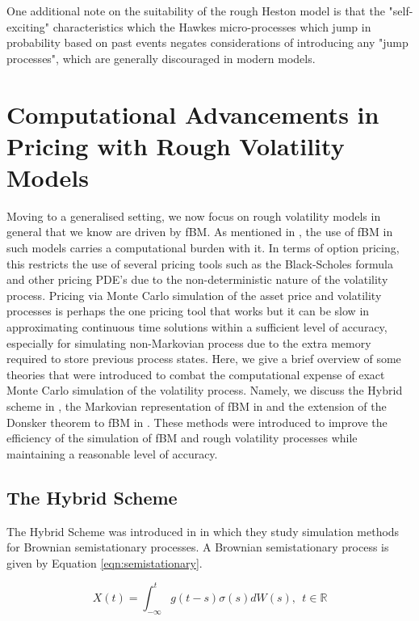 \documentclass[12pt,oneside]{article}
\begin{document}
One additional note on the suitability of the rough Heston model is that the  "self-exciting" characteristics which the Hawkes micro-processes which jump in probability based on past events negates considerations of introducing any "jump processes", which are generally discouraged in modern models. 

\section{Computational Advancements in Pricing with Rough Volatility Models}
\label{sec:comp_advancement}

Moving to a generalised setting, we now focus on rough volatility models in general that we know are driven by fBM. As mentioned in \cite{jacquier2020deep}, the use of fBM in such models carries a computational burden with it. In terms of option pricing, this restricts the use of several pricing tools such as the Black-Scholes formula and other pricing PDE's due to the non-deterministic nature of the volatility process.  Pricing via Monte Carlo simulation of the asset price and volatility processes is perhaps the one pricing tool that works but it can be slow in approximating continuous time solutions within a sufficient level of accuracy, especially for simulating non-Markovian process due to the extra memory required to store previous process states. Here, we give a brief overview of some theories that were introduced to combat the computational expense of exact Monte Carlo simulation of the volatility process. Namely, we discuss the Hybrid scheme in \cite{Bennedsen_2017}, the Markovian representation of fBM in \cite{harms2020strong} and the extension of the Donsker theorem to fBM in \cite{horvath2019functional}. These methods were introduced to improve the efficiency of the simulation of fBM and rough volatility processes while maintaining a reasonable level of accuracy.

\subsection{The Hybrid Scheme}
\label{subsec:hybrid_scheme}
The Hybrid Scheme was introduced in \cite{Bennedsen_2017} in which they study simulation methods for Brownian semistationary processes. A Brownian semistationary process is given by Equation \ref{eqn:semistationary}. 

\begin{equation}
\label{eqn:semistationary}
X(t)=\int_{-\infty}^t g(t-s) \sigma(s) dW(s),  \ \  t\in\mathbb{R}
\end{equation}
\end{document}
